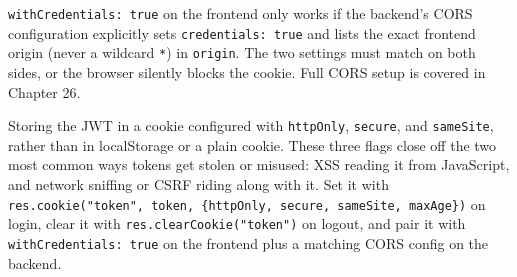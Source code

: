 \begin{warnbox}[WARNING]
\texttt{withCredentials: true} on the frontend only works if the backend's
CORS configuration explicitly sets \texttt{credentials: true} and lists the
exact frontend origin (never a wildcard \texttt{*}) in \texttt{origin}. The
two settings must match on both sides, or the browser silently blocks the
cookie. Full CORS setup is covered in Chapter 26.
\end{warnbox}

\whatwhyhow
{Storing the JWT in a cookie configured with \texttt{httpOnly}, \texttt{secure}, and \texttt{sameSite}, rather than in localStorage or a plain cookie.}
{These three flags close off the two most common ways tokens get stolen or misused: XSS reading it from JavaScript, and network sniffing or CSRF riding along with it.}
{Set it with \texttt{res.cookie("token", token, \{httpOnly, secure, sameSite, maxAge\})} on login, clear it with \texttt{res.clearCookie("token")} on logout, and pair it with \texttt{withCredentials: true} on the frontend plus a matching CORS config on the backend.}
